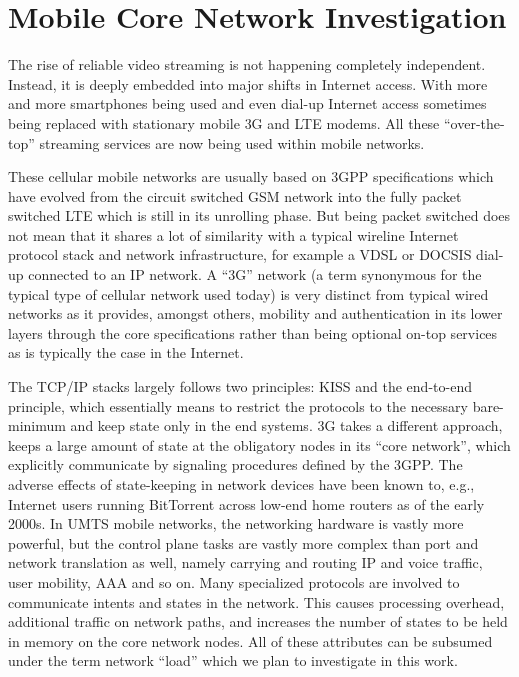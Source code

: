 \chapter{Mobile Core Network Investigation}
\label{chap:mobilenets}

The rise of reliable video streaming is not happening completely independent. Instead, it is deeply embedded into major shifts in Internet access. With more and more smartphones being used and even dial-up Internet access sometimes being replaced with stationary mobile \gls{3G} and \gls{LTE} modems. All these ``over-the-top'' streaming services are now being used within mobile networks.  

These cellular mobile networks are usually based on \gls{3GPP} specifications which have evolved from the circuit switched \gls{GSM} network into the fully packet switched \gls{LTE} which is still in its unrolling phase. But being packet switched does not mean that it shares a lot of similarity with a typical wireline Internet protocol stack and network infrastructure, for example a \gls{VDSL} or \gls{DOCSIS} dial-up connected to an \gls{IP} network. A ``3G'' network (a term synonymous for the typical type of cellular network used today) is very distinct from typical wired networks as it provides, amongst others, mobility and authentication in its lower layers through the core specifications rather than being optional on-top services as is typically the case in the Internet.


The TCP/IP stacks largely follows two principles: \gls{KISS} and the end-to-end principle\cite{saltzer1984end2end}, which essentially means to restrict the protocols to the necessary bare-minimum and keep state only in the end systems. 3G takes a different approach, keeps a large amount of state at the obligatory nodes in its ``core network'', which explicitly communicate by signaling procedures defined by the \gls{3GPP}.
The adverse effects of state-keeping in network devices have been known to, e.g.,  Internet users running BitTorrent across low-end home routers as of the early 2000s. In \gls{UMTS} mobile networks, the networking hardware is vastly more powerful, but the control plane tasks are vastly more complex than port and network translation as well, namely carrying and routing IP and voice traffic, user mobility, \gls{AAA} and so on. Many specialized protocols are involved to communicate intents and states in the network. This causes processing overhead, additional traffic on network paths, and increases the number of states to be held in memory on the core network nodes. All of these attributes can be subsumed under the term network ``load'' which we plan to investigate in this work.


